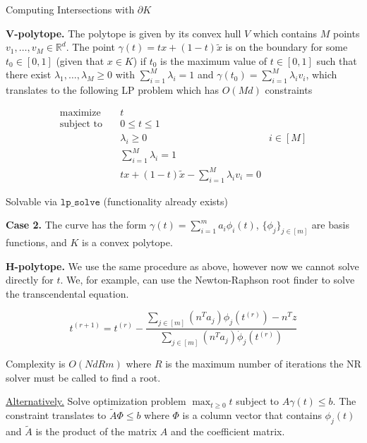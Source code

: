 \documentclass[10pt]{beamer}
\begin{document}
\begin{frame}[allowframebreaks]{Computing Intersections with $\partial K$}
    \framebreak
    
    \textbf{V-polytope.} The polytope is given by its convex hull $V$ which contains $M$ points $v_1, \dots, v_M \in \mathbb R^d$. The point $\gamma(t) = tx + (1 -t) \tilde x$ is on the boundary for some $t_0 \in [0, 1]$ (given that $x \in K$) if $t_0$ is the maximum value of $t \in [0,1]$ such that there exist $\lambda_1, \dots, \lambda_M \ge 0$ with $\sum_{i  =1}^M \lambda_i = 1$ and $\gamma(t_0) = \sum_{i = 1}^M \lambda_i v_i$, which translates to the following LP problem which has $O(Md)$ constraints
    
    \begin{align*}
        \text{maximize} \quad & t & \\
        \text{subject to} \quad & 0 \le t \le 1 & \\
        & \lambda_i \ge 0 & i \in [M] \\
        & \sum_{i = 1}^M \lambda_i = 1 \\
        & t x + (1 - t) \tilde x - \sum_{i = 1}^M \lambda_i v_i = 0 
    \end{align*}
    
    Solvable via $\texttt{lp\_solve}$ (functionality already exists)
    
    \framebreak
    
    \textbf{Case 2.} The curve has the form $\gamma(t) = \sum_{i = 1}^m a_i \phi_i(t)$, $\{ \phi_j \}_{j \in [m]}$ are basis functions, and $K$ is a convex polytope.
    
    \medskip
    
    \textbf{H-polytope.} We use the same procedure as above, however now we cannot solve directly for $t$. We, for example, can use the Newton-Raphson root finder to solve the transcendental equation.
    
    \begin{equation*}
        t^{(r + 1)} = t^{(r)} - \frac {\sum_{j \in [m]} (n^T a_j) \phi_j(t^{(r)}) - n^T z } {\sum_{j \in [m]} (n^T a_j) \dot \phi_j(t^{(r)})}
    \end{equation*}

    Complexity is $O(NdRm)$ where $R$ is the maximum number of iterations the NR solver must be called to find a root. 
    
    \underline{Alternatively.} Solve optimization problem $\max_{t \ge 0} t$ subject to $A \gamma(t) \le b$. The constraint translates to $\tilde A \Phi \le b$ where $\Phi$ is a column vector that contains $\phi_j(t)$ and $\tilde A$ is the product of the matrix $A$ and the coefficient matrix. 
     

\end{frame}
\end{document}
